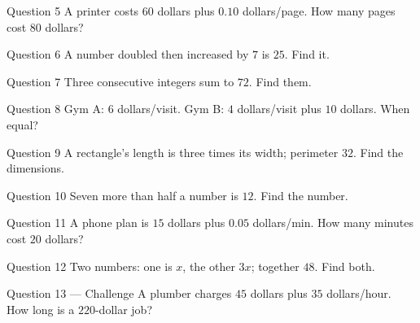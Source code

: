 \documentclass[11pt]{article}
\begin{document}
\begin{qbox}{Question 5}
A printer costs $60$ dollars plus $0.10$ dollars/page. How many pages cost $80$ dollars?\workspace{2.4cm}
\end{qbox}

\begin{qbox}{Question 6}
A number doubled then increased by $7$ is $25$. Find it.\workspace{2.2cm}
\end{qbox}

\begin{qbox}{Question 7}
Three consecutive integers sum to $72$. Find them.\workspace{2.4cm}
\end{qbox}

\begin{qbox}{Question 8}
Gym A: $6$ dollars/visit. Gym B: $4$ dollars/visit plus $10$ dollars. When equal?\workspace{2.4cm}
\end{qbox}

\begin{qbox}{Question 9}
A rectangle's length is three times its width; perimeter $32$. Find the dimensions.\workspace{2.4cm}
\end{qbox}

\begin{qbox}{Question 10}
Seven more than half a number is $12$. Find the number.\workspace{2.2cm}
\end{qbox}

\begin{qbox}{Question 11}
A phone plan is $15$ dollars plus $0.05$ dollars/min. How many minutes cost $20$ dollars?\workspace{2.4cm}
\end{qbox}

\begin{qbox}{Question 12}
Two numbers: one is $x$, the other $3x$; together $48$. Find both.\workspace{2.4cm}
\end{qbox}

\begin{qbox}{Question 13 --- Challenge}
A plumber charges $45$ dollars plus $35$ dollars/hour. How long is a $220$-dollar job?\workspace{2.6cm}
\end{qbox}

\clearpage
{}
\end{document}
